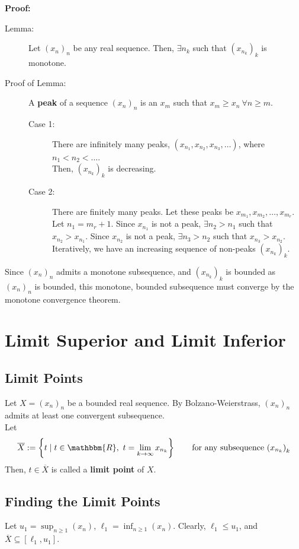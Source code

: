 \documentclass[10pt]{extarticle}
\newcommand{\R}{\mathbbm{R}}
\begin{document}
    \textbf{Proof:}
    \begin{description}
      \item[Lemma:] Let $(x_n)_n$ be any real sequence. Then, $\exists n_k$ such that $(x_{n_k})_k$ is monotone.
      \item[Proof of Lemma:] A \textbf{peak} of a sequence $(x_n)_n$ is an $x_m$ such that $x_m \geq x_n~\forall n\geq m$.
      \begin{description}
        \item[Case 1:] There are infinitely many peaks, $(x_{n_1}, x_{n_2},x_{n_3},\dots)$, where $n_1 < n_2<\dots$.\\

          Then, $(x_{n_k})_k$ is decreasing.
        \item[Case 2:] There are finitely many peaks. Let these peaks be $x_{m_1},x_{m_2},\dots,x_{m_r}$.\\

          Let $n_1 = m_r + 1$. Since $x_{n_1}$ is not a peak, $\exists n_2 > n_1$ such that $x_{n_2} > x_{n_1}$. Since $x_{n_2}$ is not a peak, $\exists n_3 > n_2$ such that $x_{n_3} > x_{n_2}$.\\

          Iteratively, we have an increasing sequence of non-peaks $(x_{n_k})_k$.
      \end{description}
    \end{description}
    Since $(x_n)_n$ admits a monotone subsequence, and $(x_{n_k})_k$ is bounded as $(x_n)_n$ is bounded, this monotone, bounded subsequence must converge by the monotone convergence theorem.
  \section{Limit Superior and Limit Inferior}%
  \subsection{Limit Points}%
    Let $X = (x_n)_n$ be a bounded real sequence. By Bolzano-Weierstrass, $(x_n)_n$ admits at least one convergent subsequence.\\

    Let
    \begin{align*}
      \overline{X} := \left\{t \mid t\in\R,~t = \lim_{k\rightarrow\infty}x_{n_k}\right\} \tag*{for any subsequence $\left(x_{n_k}\right)_k$}
    \end{align*}
    Then, $t\in\overline{X}$ is called a \textbf{limit point} of $X$.
    \subsection{Finding the Limit Points}%
    Let $u_1 = \sup_{n\geq 1}(x_n)$, $\ell_1 = \inf_{n\geq 1}(x_n)$. Clearly, $\ell_1 \leq u_1$, and $\overline{X} \subseteq [\ell_1,u_1]$.\\
\end{document}
